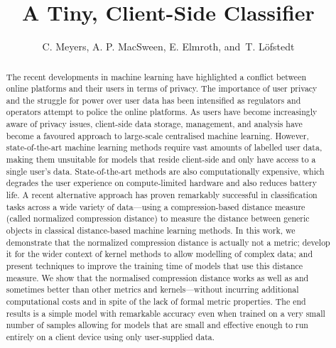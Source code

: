 \documentclass[preprint,12pt]{article}
\begin{document}
\title{A Tiny, Client-Side Classifier}


\author{C. Meyers, A. P. MacSween, E. Elmroth, and~T. L\"{o}fstedt}

\maketitle


\begin{abstract}
The recent developments in machine learning have highlighted a conflict between online platforms and their users in terms of privacy.
The importance of user privacy and the struggle for power over user data has been intensified as regulators and operators attempt to police the online platforms.
As users have become increasingly aware of privacy issues, client-side data storage, management, and analysis have become a favoured approach to large-scale centralised machine learning.
However, state-of-the-art machine learning methods require vast amounts of labelled user data, making them unsuitable for models that reside client-side and only have access to a single user's data.
State-of-the-art methods are also computationally expensive, which degrades the user experience on compute-limited hardware and also reduces battery life.
A recent alternative approach has proven remarkably successful in classification tasks across a wide variety of data---using a compression-based distance measure (called normalized compression distance) to measure the distance between generic objects in classical distance-based machine learning methods.
In this work, we demonstrate that the normalized compression distance is actually not a metric; develop it for the wider context of kernel methods to allow modelling of complex data; and present techniques to improve the training time of models that use this distance measure.
We show that the normalised compression distance works as well as and sometimes better than other metrics and kernels---without incurring additional computational costs and in spite of the lack of formal metric properties.
The end results is a simple model with remarkable accuracy even when trained on a very small number of samples allowing for models that are small and effective enough to run entirely on a client device using only user-supplied data.
\end{abstract}
\end{document}
